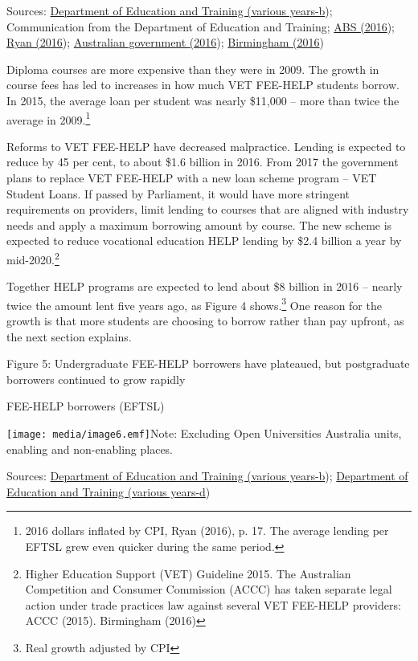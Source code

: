 \documentclass[]{book}
\begin{document}
Sources: \protect\hyperlink{_ENREF_36}{Department of Education and Training (various years-b}); Communication from the Department of Education and Training; \protect\hyperlink{_ENREF_6}{ABS (2016}); \protect\hyperlink{_ENREF_71}{Ryan (2016}); \protect\hyperlink{_ENREF_13}{Australian government (2016}); \protect\hyperlink{_ENREF_12}{Birmingham (2016})

Diploma courses are more expensive than they were in 2009. The growth in course fees has led to increases in how much VET FEE-HELP students borrow. In 2015, the average loan per student was nearly \$11,000 -- more than twice the average in 2009.\footnote{2016 dollars inflated by CPI, Ryan (2016), p. 17. The average lending per EFTSL grew even quicker during the same period.}

Reforms to VET FEE-HELP have decreased malpractice. Lending is expected to reduce by 45 per cent, to about \$1.6 billion in 2016. From 2017 the government plans to replace VET FEE-HELP with a new loan scheme program -- VET Student Loans. If passed by Parliament, it would have more stringent requirements on providers, limit lending to courses that are aligned with industry needs and apply a maximum borrowing amount by course. The new scheme is expected to reduce vocational education HELP lending by \$2.4 billion a year by mid-2020.\footnote{Higher Education Support (VET) Guideline 2015. The Australian Competition and Consumer Commission (ACCC) has taken separate legal action under trade practices law against several VET FEE-HELP providers: ACCC (2015). Birmingham (2016)}

Together HELP programs are expected to lend about \$8 billion in 2016 -- nearly twice the amount lent five years ago, as Figure 4 shows.\footnote{Real growth adjusted by CPI} One reason for the growth is that more students are choosing to borrow rather than pay upfront, as the next section explains.

\protect\hypertarget{_Ref335386889}{}{}Figure 5: Undergraduate FEE-HELP borrowers have plateaued, but postgraduate borrowers continued to grow rapidly

FEE-HELP borrowers (EFTSL)

\texttt{[image: media/image6.emf]}Note: Excluding Open Universities Australia units, enabling and non-enabling places.

Sources: \protect\hyperlink{_ENREF_36}{Department of Education and Training (various years-b}); \protect\hyperlink{_ENREF_38}{Department of Education and Training (various years-d})
\end{document}
